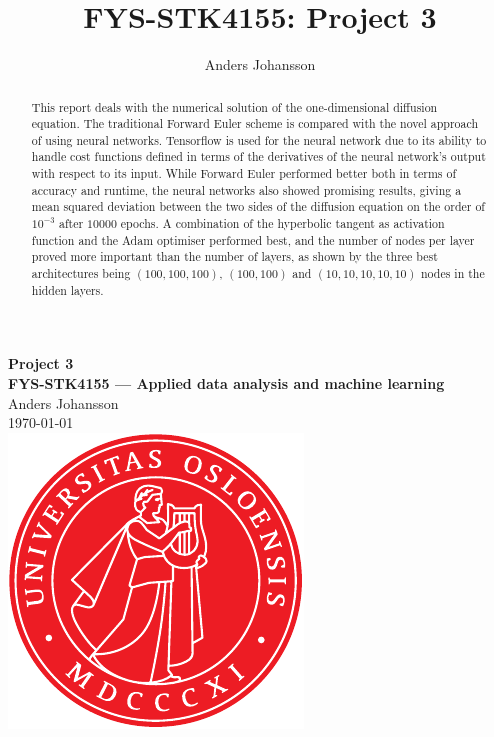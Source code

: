 \documentclass[11pt,british,a4paper]{article}
\numberwithin{equation}{section}
\begin{document}
\tikzexternaldisable
\title{FYS-STK4155: Project 3}
\author{Anders Johansson}

\begin{titlepage}
\vspace*{\fill}
\begin{center}
\textsf{
    \Huge \textbf{Project 3}\\\vspace{0.5cm}
    \Large \textbf{FYS-STK4155 --- Applied data analysis and machine learning}\\
    \vspace{8cm}
    Anders Johansson\\
    \today\\
}
\vspace{1.5cm}
\includegraphics{uio.pdf}\\
\vspace*{\fill}
\end{center}
\end{titlepage}
\null
\pagestyle{empty}
\newpage

\pagestyle{fancy}
\setcounter{page}{1}

\begin{abstract}
    This report deals with the numerical solution of the one-dimensional diffusion equation. The traditional Forward Euler scheme is compared with the novel approach of using neural networks. Tensorflow is used for the neural network due to its ability to handle cost functions defined in terms of the derivatives of the neural network's output with respect to its input. While Forward Euler performed better both in terms of accuracy and runtime, the neural networks also showed promising results, giving a mean squared deviation between the two sides of the diffusion equation on the order of \(10^{-3}\) after \(\num{10000}\) epochs. A combination of the hyperbolic tangent as activation function and the Adam optimiser performed best, and the number of nodes per layer proved more important than the number of layers, as shown by the three best architectures being \((100,100,100)\), \((100,100)\) and \((10,10,10,10,10)\) nodes in the hidden layers.
\end{abstract}
\pagestyle{fancy}
\thispagestyle{fancy}
\tableofcontents
\pagestyle{fancy}
\thispagestyle{fancy}
\end{document}
